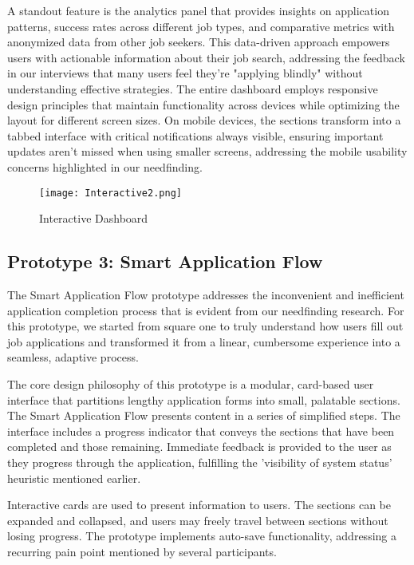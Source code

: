 \documentclass[
	letterpaper, %
]{jdf}
\begin{document}
\begin{sloppypar}
A standout feature is the analytics panel that provides insights on application patterns, success rates across different job types, and comparative metrics with anonymized data from other job seekers. This data-driven approach empowers users with actionable information about their job search, addressing the feedback in our interviews that many users feel they're "applying blindly" without understanding effective strategies. The entire dashboard employs responsive design principles that maintain functionality across devices while optimizing the layout for different screen sizes. On mobile devices, the sections transform into a tabbed interface with critical notifications always visible, ensuring important updates aren't missed when using smaller screens, addressing the mobile usability concerns highlighted in our needfinding.


\begin{figure}
    \centering
    \texttt{[image: Interactive2.png]}
    \caption{Interactive Dashboard}
    \label{fig:enter-label}
\end{figure}
\newpage
\subsection{Prototype 3: Smart Application Flow}

The Smart Application Flow prototype addresses the inconvenient and inefficient application completion process that is evident from our needfinding research. For this prototype, we started from square one to truly understand how users fill out job applications and transformed it from a linear, cumbersome experience into a seamless, adaptive process.

The core design philosophy of this prototype is a modular, card-based user interface that partitions lengthy application forms into small, palatable sections. The Smart Application Flow presents content in a series of simplified steps. The interface includes a progress indicator that conveys the sections that have been completed and those remaining. Immediate feedback is provided to the user as they progress through the application, fulfilling the 'visibility of system status' heuristic mentioned earlier.

Interactive cards are used to present information to users. The sections can be expanded and collapsed, and users may freely travel between sections without losing progress. The prototype implements auto-save functionality, addressing a recurring pain point mentioned by several participants.


\end{sloppypar}
\end{document}
